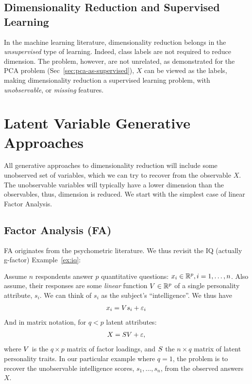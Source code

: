 \documentclass[12pt,a4paper]{article}
\begin{document}
\subsection{Dimensionality Reduction and Supervised Learning}
\label{sec:dim-reduce-and-supervised}

In the machine learning literature, dimensionality reduction belongs in the \emph{unsupervised} type of learning. 
Indeed, class labels are not required to reduce dimension.
The problem, however, are not unrelated, as demonstrated for the PCA problem (Sec~\ref{sec:pca-as-supervised}), $X$ can be viewed as the labels, making dimensionality reduction a supervised learning problem, with \emph{unobservable}, or \emph{missing} features. 








\section{Latent Variable Generative Approaches}
All generative approaches to dimensionality reduction will include some unobserved set of variables, which we can try to recover from the observable $X$. 
The unobservable variables will typically have a lower dimension than the observables, thus, dimension is reduced. 
We start with the simplest case of linear Factor Analysis. 


\subsection{Factor Analysis (FA)}

FA originates from the psychometric literature. 
We thus revisit the IQ (actually g-factor) Example~\ref{ex:iq}:
\begin{example}
	
	Assume $n$ respondents answer $p$ quantitative questions: $x_i \in \mathbb{R}^p, i=1,\dots,n$. 
	Also assume, their responses are some \emph{linear} function $V \in \mathbb{R}^p$ of a single personality attribute, $s_i$. 
	We can think of $s_i$ as the subject's ``intelligence''.
	We thus have 
	\begin{align}
	x_i = V s_i + \varepsilon_i
	\end{align}
And in matrix notation, for $q<p$ latent attributes:
	\begin{align}
	\label{eq:factor}
		X = S V  +\varepsilon,
	\end{align}
where $V$ is the $q \times p$ matrix of factor loadings, and $S$ the $n \times q$ matrix of latent personality traits. 
In our particular example where $q=1$, the problem is to recover the unobservable intelligence scores, $s_1,\dots,s_n$, from the observed answers $X$.	
\end{example}
\end{document}
